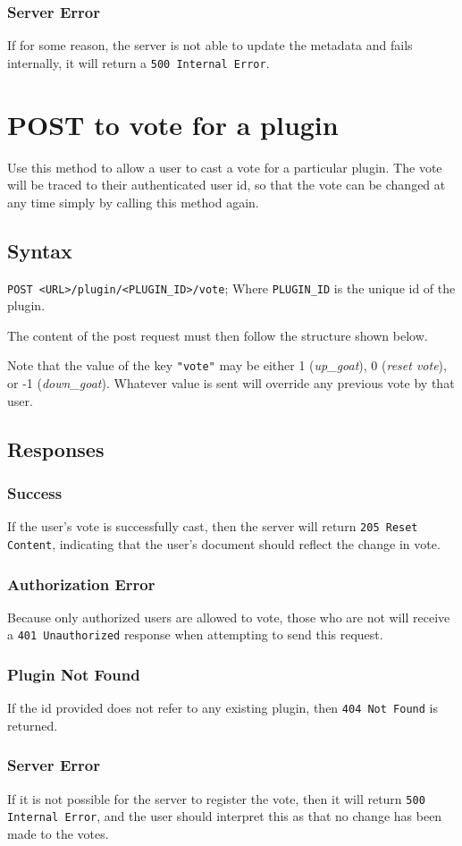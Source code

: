 \documentclass[a4paper, 12pt]{article}
\begin{document}
			\subsubsection{Server Error}
				If for some reason, the server is not able to update the metadata and fails internally, it will return a \verb|500 Internal Error|.

	\section{POST to vote for a plugin}
		Use this method to allow a user to cast a vote for a particular plugin. The vote will be traced to their authenticated user id, so that the vote can be changed at any time simply by calling this method again.

		\subsection{Syntax}
			\verb|POST <URL>/plugin/<PLUGIN_ID>/vote|; \footnotesize{Where \verb|PLUGIN_ID| is the unique id of the plugin.}

			The content of the post request must then follow the structure shown below.

			

			Note that the value of the key \verb|"vote"| may be either 1 (\emph{up\_goat}), 0 (\emph{reset vote}), or -1 (\emph{down\_goat}). Whatever value is sent will override any previous vote by that user.

		\subsection{Responses}
			\subsubsection{Success}
				If the user's vote is successfully cast, then the server will return \verb|205 Reset Content|, indicating that the user's document should reflect the change in vote.

			\subsubsection{Authorization Error}
				Because only authorized users are allowed to vote, those who are not will receive a \verb|401 Unauthorized| response when attempting to send this request.

			\subsubsection{Plugin Not Found}
				If the id provided does not refer to any existing plugin, then \verb|404 Not Found| is returned.

			\subsubsection{Server Error}
				If it is not possible for the server to register the vote, then it will return \verb|500 Internal Error|, and the user should interpret this as that no change has been made to the votes.
\end{document}
